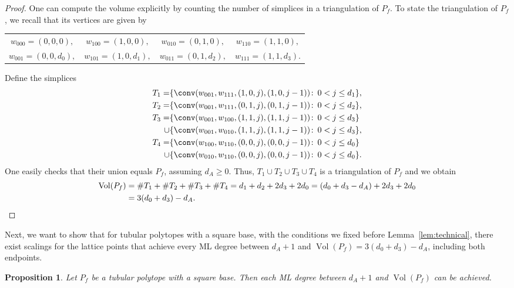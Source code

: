 \documentclass[12pt,reqno]{amsart}   	%
\theoremstyle{plain}
\newtheorem{proposition}[theorem]{Proposition}
\theoremstyle{definition}
\theoremstyle{remark}
\newcommand{\vol}{\operatorname{Vol}}
\begin{document}
\begin{proof}
    One can compute the volume explicitly by counting the number of simplices in a triangulation of $P_f$. To state the triangulation of $P_f$, we recall that its vertices are given by
    \begin{center}
    \begin{tabular}{@{}cccc@{}}
    $w_{000}=(0,0,0),$ &
    $w_{100}=(1,0,0),$ &
    $w_{010}=(0,1,0),$ &
    $w_{110}=(1,1,0),$ \\[4pt]
    $w_{001}=(0,0,d_0),$ &
    $w_{101}=(1,0,d_1),$ &
    $w_{011}=(0,1,d_2),$ &
    $w_{111}=(1,1,d_3).$
    \end{tabular}
    \end{center}
    Define the simplices
    \begin{align*}
        T_1 = &\{ \conv(w_{001},w_{111},(1,0,j),(1,0,j-1)) \colon \, 0 < j \leq d_1 \}, \\
        T_2 = &\{ \conv(w_{001},w_{111},(0,1,j),(0,1,j-1)) \colon \, 0<j\leq d_2  \}, \\
        T_3 = &\{ \conv(w_{001},w_{100},(1,1,j),(1,1,j-1)) \colon \, 0<j\leq d_3\} \\
             \cup &\{\conv(w_{001},w_{010},(1,1,j),(1,1,j-1)) \colon \, 0<j\leq d_3 \}, \\
        T_4 = &\{ \conv(w_{100},w_{110},(0,0,j),(0,0,j-1)) \colon \, 0<j\leq d_0\} \\
             \cup &\{ \conv(w_{010},w_{110},(0,0,j),(0,0,j-1)) \colon \, 0<j\leq d_0\}.
    \end{align*}
    One easily checks that their union equals $P_f$, assuming $d_A\geq 0$. Thus, $T_1 \cup T_2 \cup T_3 \cup T_4 $ is a triangulation of $P_f$ and we obtain
    \begin{align*}
    \vol(P_f) &= \# T_1+\# T_2+\# T_3+\# T_4 = d_1 + d_2 + 2d_3 + 2d_0 = (d_0+d_3-d_A) +2d_3+2d_0 \\
    &= 3(d_0+d_3)-d_A. \qedhere
    \end{align*}
\end{proof}
Next, we want to show that for tubular polytopes with a square base, with the conditions we fixed before Lemma~\ref{lem:technical}, there exist scalings for the lattice points that achieve every ML degree between $d_A+1$ and $\vol(P_f)= 3(d_0+d_3)-d_A$, including both endpoints. 
\begin{proposition}\label{scalings for ML degrees}
    Let $P_f$ be a tubular polytope with a square base. Then each ML degree between $d_A+1$ and $\vol (P_f)$ can be achieved.
\end{proposition}
\end{document}
